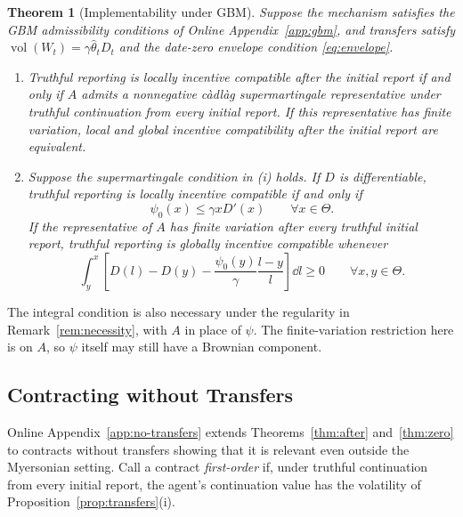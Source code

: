 \documentclass[12pt]{article}
\newtheorem{theorem}{Theorem}
\DeclareMathOperator{\vol}{vol}
\newcommand{\hth}{\hat\theta}
\begin{document}
\begin{theorem}[Implementability under GBM]\label{thm:gbm}
Suppose the mechanism satisfies the GBM admissibility conditions of
Online Appendix~\ref{app:gbm}, and transfers satisfy
\(\vol(W_t)=\gamma\hth_tD_t\) and the date-zero envelope condition
\eqref{eq:envelope}.
\begin{enumerate}[label=\textnormal{(\roman*)},beginpenalty=10000]
\item Truthful reporting is locally incentive compatible after the
initial report if and only if \(A\) admits a nonnegative c\`adl\`ag
supermartingale representative under truthful continuation from every
initial report. If this representative has finite variation, local
and global incentive compatibility after the initial report are
equivalent.

\item Suppose the supermartingale condition in \textnormal{(i)} holds.
If \(D\) is differentiable, truthful reporting is locally incentive
compatible if and only if
\begin{equation}\label{eq:gbm-local-zero}
  \psi_0(x)\leq\gamma xD'(x)
  \qquad \forall x\in\Theta.
\end{equation}
If the representative of $A$ has finite variation after every truthful initial report,
truthful reporting is globally incentive compatible whenever
\begin{equation}\label{eq:gbm-global-zero}
  \int_y^x\left[D(l)-D(y)
    -\frac{\psi_0(y)}{\gamma}\frac{l-y}{l}\right]\dd l
  \geq0
  \qquad \forall x,y\in\Theta.
\end{equation}
\end{enumerate}
\end{theorem}

The integral condition is also necessary under the regularity in
Remark~\ref{rem:necessity}, with \(A\) in place of \(\psi\).
The finite-variation restriction here is on \(A\), so \(\psi\) itself
may still have a Brownian component.

\subsection{Contracting without Transfers}
Online Appendix~\ref{app:no-transfers} extends
Theorems~\ref{thm:after} and~\ref{thm:zero} to contracts without
transfers showing that it is relevant even outside the Myersonian setting. Call a contract \emph{first-order} if, under truthful
continuation from every initial report, the agent's continuation value
has the volatility of
Proposition~\ref{prop:transfers}(i).
\end{document}
